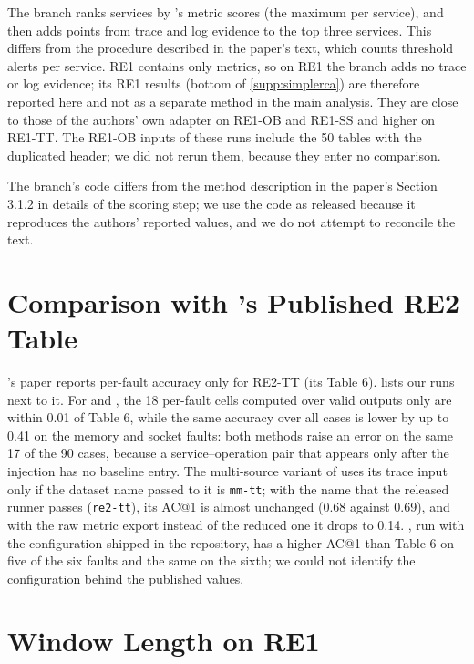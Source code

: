 \documentclass[10pt]{article}
\begin{document}
The branch ranks services by \baro's metric scores (the maximum per service), and then adds points from trace and log evidence to the top three services.
This differs from the procedure described in the paper's text, which counts threshold alerts per service.
RE1 contains only metrics, so on RE1 the branch adds no trace or log evidence; its RE1 results (bottom of \cref{supp:simplerca}) are therefore reported here and not as a separate method in the main analysis.
They are close to those of the authors' own \baro adapter on RE1-OB and RE1-SS and higher on RE1-TT.
The RE1-OB inputs of these runs include the 50 tables with the duplicated header; we did not rerun them, because they enter no comparison.

The branch's code differs from the method description in the \simplerca paper's Section 3.1.2 in details of the scoring step; we use the code as released because it reproduces the authors' reported values, and we do not attempt to reconcile the text.



\section{Comparison with \rcaeval's Published RE2 Table}
\label{sec:table6}

\rcaeval's paper reports per-fault accuracy only for RE2-TT (its Table 6).
 lists our runs next to it.
For \tracerca and \microrank, the 18 per-fault cells computed over valid outputs only are within 0.01 of Table 6, while the same accuracy over all cases is lower by up to 0.41 on the memory and socket faults: both methods raise an error on the same 17 of the 90 cases, because a service--operation pair that appears only after the injection has no baseline entry.
The multi-source variant of \baro uses its trace input only if the dataset name passed to it is \texttt{mm-tt}; with the name that the released runner passes (\texttt{re2-tt}), its AC@1 is almost unchanged (0.68 against 0.69), and with the raw metric export instead of the reduced one it drops to 0.14.
\circa, run with the configuration shipped in the repository, has a higher AC@1 than Table 6 on five of the six faults and the same on the sixth; we could not identify the configuration behind the published values.



\section{Window Length on RE1}
\label{sec:window}
\end{document}
